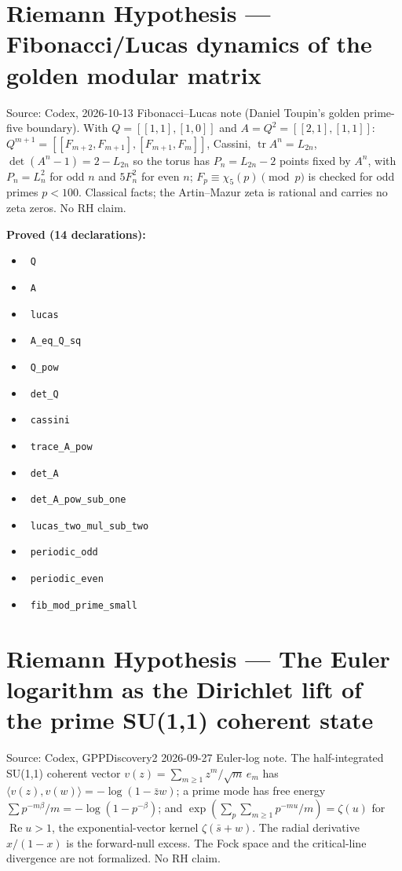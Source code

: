 \documentclass{report}
\theoremstyle{definition}
\begin{document}
\section{Riemann Hypothesis --- Fibonacci/Lucas dynamics of the golden modular matrix}
Source: Codex, 2026-10-13 Fibonacci--Lucas note (Daniel Toupin's golden prime-five boundary). With $Q=[[1,1],[1,0]]$ and $A=Q^2=[[2,1],[1,1]]$: $Q^{m+1}=[[F_{m+2},F_{m+1}],[F_{m+1},F_m]]$, Cassini, $\operatorname{tr}A^n=L_{2n}$, $\det(A^n-1)=2-L_{2n}$ so the torus has $P_n=L_{2n}-2$ points fixed by $A^n$, with $P_n=L_n^2$ for odd $n$ and $5F_n^2$ for even $n$; $F_p\equiv\chi_5(p)\pmod p$ is checked for odd primes $p<100$. Classical facts; the Artin--Mazur zeta is rational and carries no zeta zeros. No RH claim.

\noindent\textbf{Proved (14 declarations):}
\begin{itemize}
  \item {}\leanok\ \texttt{Q}
  \item {}\leanok\ \texttt{A}
  \item {}\leanok\ \texttt{lucas}
  \item {}\leanok\ \texttt{A\_eq\_Q\_sq}
  \item {}\leanok\ \texttt{Q\_pow}
  \item {}\leanok\ \texttt{det\_Q}
  \item {}\leanok\ \texttt{cassini}
  \item {}\leanok\ \texttt{trace\_A\_pow}
  \item {}\leanok\ \texttt{det\_A}
  \item {}\leanok\ \texttt{det\_A\_pow\_sub\_one}
  \item {}\leanok\ \texttt{lucas\_two\_mul\_sub\_two}
  \item {}\leanok\ \texttt{periodic\_odd}
  \item {}\leanok\ \texttt{periodic\_even}
  \item {}\leanok\ \texttt{fib\_mod\_prime\_small}
\end{itemize}

\section{Riemann Hypothesis --- The Euler logarithm as the Dirichlet lift of the prime SU(1,1) coherent state}
Source: Codex, GPPDiscovery2 2026-09-27 Euler-log note. The half-integrated SU(1,1) coherent vector $v(z)=\sum_{m\ge1}z^m/\sqrt m\,e_m$ has $\langle v(z),v(w)\rangle=-\log(1-\bar zw)$; a prime mode has free energy $\sum p^{-m\beta}/m=-\log(1-p^{-\beta})$; and $\exp(\sum_p\sum_{m\ge1}p^{-mu}/m)=\zeta(u)$ for $\operatorname{Re}u>1$, the exponential-vector kernel $\zeta(\bar s+w)$. The radial derivative $x/(1-x)$ is the forward-null excess. The Fock space and the critical-line divergence are not formalized. No RH claim.
\end{document}
